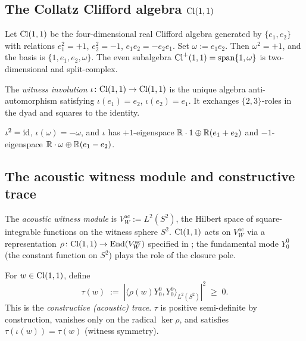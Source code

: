 \subsection{The Collatz Clifford algebra $\mathrm{Cl}(1,1)$}

\begin{definition}
\label{def:collatz-cl11}
Let $\mathrm{Cl}(1,1)$ be the four-dimensional real Clifford algebra
generated by $\{e_1, e_2\}$ with relations
$e_1^2 = +1$, $e_2^2 = -1$, $e_1 e_2 = -e_2 e_1$.  Set
$\omega := e_1 e_2$.  Then $\omega^2 = +1$, and the basis is
$\{1, e_1, e_2, \omega\}$.  The even subalgebra
$\mathrm{Cl}^+(1,1) = \operatorname{span}\{1, \omega\}$ is two-dimensional and
split-complex.
\end{definition}

\begin{definition}
\label{def:witness-involution}
The \emph{witness involution} $\iota \colon \mathrm{Cl}(1,1) \to \mathrm{Cl}(1,1)$
is the unique algebra anti-automorphism satisfying
$\iota(e_1) = e_2$, $\iota(e_2) = e_1$.  It exchanges
$\{2, 3\}$-roles in the dyad and squares to the identity.
\end{definition}

\begin{proposition}
\label{prop:iota-properties}
$\iota^2 = \mathrm{id}$, $\iota(\omega) = -\omega$, and $\iota$ has
$+1$-eigenspace $\mathbb{R} \cdot 1 \oplus \mathbb{R}(e_1 + e_2)$ and
$-1$-eigenspace $\mathbb{R} \cdot \omega \oplus \mathbb{R}(e_1 - e_2)$.
\end{proposition}

\subsection{The acoustic witness module and constructive trace}

\begin{definition}
\label{def:witness-module}
The \emph{acoustic witness module} is
$V_W^{\mathrm{ac}} := L^2(S^2)$, the Hilbert space of square-integrable
functions on the witness sphere $S^2$.  $\mathrm{Cl}(1,1)$ acts on
$V_W^{\mathrm{ac}}$ via a representation $\rho \colon \mathrm{Cl}(1,1) \to
\mathrm{End}(V_W^{\mathrm{ac}})$ specified in
\cite[\S 8.3]{echo-rh}; the fundamental mode $Y_0^0$ (the constant
function on $S^2$) plays the role of the closure pole.
\end{definition}

\begin{definition}
\label{def:witness-trace-acoustic}
For $w \in \mathrm{Cl}(1,1)$, define
\[
  \tau(w) \;:=\; |\langle \rho(w) Y_0^0, Y_0^0 \rangle_{L^2(S^2)}|^2
        \;\ge\; 0.
\]
This is the \emph{constructive (acoustic) trace}.  $\tau$ is
positive semi-definite by construction, vanishes only on the
radical $\ker \rho$, and satisfies $\tau(\iota(w)) = \tau(w)$
(witness symmetry).
\end{definition}

